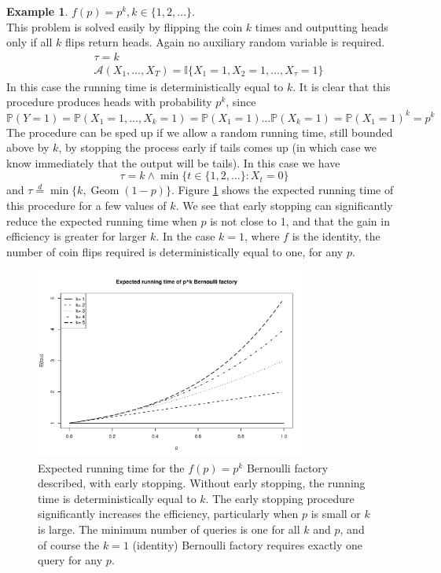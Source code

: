 \documentclass{article}
\theoremstyle{definition}
\newtheorem{example}{Example}
\newcommand{\PR}{\mathbb{P}}
\newcommand{\eqdist}{\overset{d}{=}}
\newcommand{\Geom}{\operatorname{Geom}}
\newcommand{\A}{\mathcal{A}}
\begin{document}
\begin{example}\label{ex:bf_pk}
$f(p) = p^k, k\in\{1,2,\dots\}$.\\
This problem is solved easily by flipping the coin $k$ times and outputting heads only if all $k$ flips return heads. Again no auxiliary random variable is required.
\begin{align*}
& \tau = k \\
& \A(X_1,\dots,X_T) = \mathbb{I}\{X_1 =1, X_2=1 ,\dots,X_\tau=1\}
\end{align*}
In this case the running time is deterministically equal to $k$. It is clear that this procedure produces heads with probability $p^k$, since 
\begin{equation*}
\PR(Y=1) = \PR(X_1 = 1, \dots, X_k = 1) = \PR(X_1 = 1)\dots \PR(X_k = 1) = \PR(X_1 = 1)^k = p^k
\end{equation*}
The procedure can be sped up if we allow a random running time, still bounded above by $k$, by stopping the process early if tails comes up (in which case we know immediately that the output will be tails). In this case we have
\begin{equation*}
\tau = k \wedge \min\{t \in \{1,2,\dots\}:X_t=0 \}
\end{equation*}
and $\tau \eqdist \min\{k, \Geom(1-p)\}$.
Figure \ref{fig:p2_runtime} shows the expected running time of this procedure for a few values of $k$. We see that early stopping can significantly reduce the expected running time when $p$ is not close to 1, and that the gain in efficiency is greater for larger $k$. In the case $k=1$, where $f$ is the identity, the number of coin flips required is deterministically equal to one, for any $p$.
\begin{figure}
\centering
\includegraphics[width=0.8\textwidth]{pk_runtime.pdf}
\caption{Expected running time for the $f(p)=p^k$ Bernoulli factory described, with early stopping. Without early stopping, the running time is deterministically equal to $k$. The early stopping procedure significantly increases the efficiency, particularly when $p$ is small or $k$ is large. The minimum number of queries is one for all $k$ and $p$, and of course the $k=1$ (identity) Bernoulli factory requires exactly one query for any $p$.}\label{fig:p2_runtime}
\end{figure}
\end{example}
\end{document}
